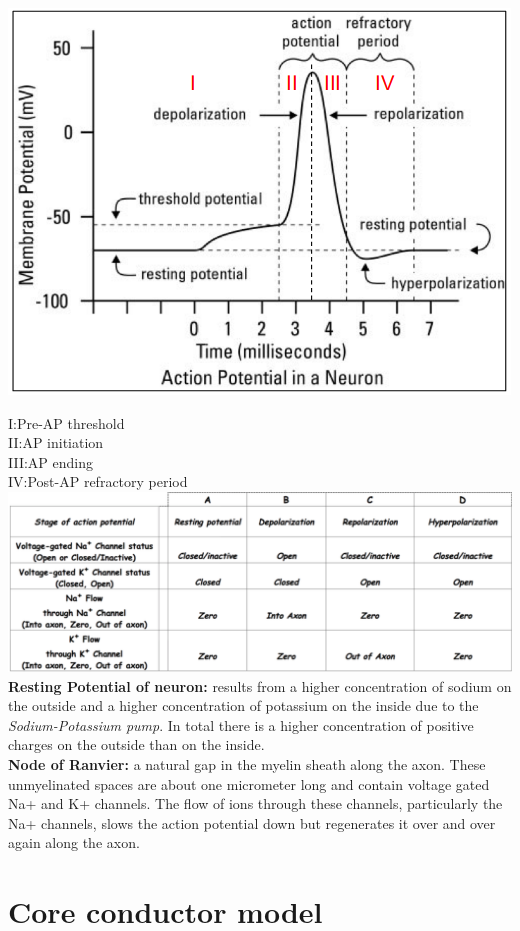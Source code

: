 \documentclass[9pt]{article}
\begin{document}
\begin{multicols}{2}
		\includegraphics[width=0.8\linewidth]{Images/AP.png}

		I:Pre-AP threshold\\
		II:AP initiation\\
		III:AP ending\\
		IV:Post-AP refractory period\\
\includegraphics[width=0.8\linewidth]{Something/Images/sodium_potassium_gates.png}\\
		\textbf{Resting Potential of neuron: }results from a higher concentration of sodium on the outside and a higher concentration of potassium on the inside due to the \emph{Sodium-Potassium pump}. In total there is a higher concentration of positive charges on the outside than on the inside.\\
		\textbf{Node of Ranvier: }a natural gap in the myelin sheath along the axon. These unmyelinated spaces are about one micrometer long and contain voltage gated Na+ and K+ channels. The flow of ions through these channels, particularly the Na+ channels, slows the action potential down but regenerates it over and over again along the axon.		
\section{Core conductor model}


\end{multicols}
\end{document}
